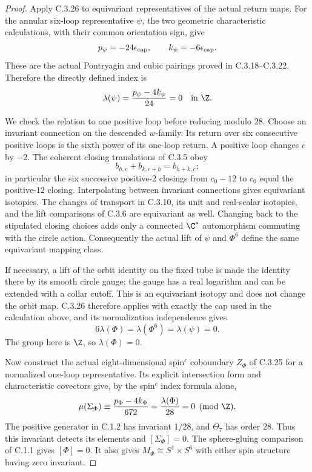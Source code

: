 \begin{proof}
Apply C.3.26 to equivariant representatives of the actual return
maps. For the annular six-loop representative $\psi$, the two
geometric characteristic calculations, with their common
orientation sign, give
\[
 p_\psi=-24\epsilon_{\rm cap},\qquad
 k_\psi=-6\epsilon_{\rm cap}.
\]
These are the actual Pontryagin and cubic pairings proved in
C.3.18--C.3.22. Therefore the directly defined index is
\[
 \lambda(\psi)=\frac{p_\psi-4k_\psi}{24}=0
 \quad\hbox{in }\Z.
\]

We check the relation to one positive loop before reducing
modulo $28$. Choose an invariant connection on the descended
$w$-family. Its return over six consecutive positive loops is
the sixth power of its one-loop return. A positive loop changes
$c$ by $-2$. The coherent closing translations of C.3.5 obey
\[
 b_{h,c}+b_{k,c+h}=b_{h+k,c};
\]
in particular the six successive positive-$2$ closings from
$c_0-12$ to $c_0$ equal the positive-$12$ closing. Interpolating
between invariant connections gives equivariant isotopies.
The changes of transport in C.3.10, its unit and real-scalar
isotopies, and the lift comparisons of C.3.6 are equivariant
as well. Changing back to the stipulated closing choices
adds only a connected $\C^*$ automorphism commuting with the
circle action. Consequently the actual lift of $\psi$ and
$\Phi^6$ define the same equivariant mapping class.

If necessary, a lift of the orbit identity on the fixed tube
is made the identity there by its smooth circle gauge; the
gauge has a real logarithm and can be extended with a collar
cutoff. This is an equivariant isotopy and does not change the
orbit map. C.3.26 therefore applies with exactly the cap used
in the calculation above, and its normalization independence
gives
\[
 6\lambda(\Phi)=\lambda(\Phi^6)=\lambda(\psi)=0.
\]
The group here is $\Z$, so $\lambda(\Phi)=0$.

Now construct the actual eight-dimensional spin$^c$ coboundary
$Z_\Phi$ of C.3.25 for a normalized one-loop representative.
Its explicit intersection form and characteristic covectors
give, by the spin$^c$ index formula alone,
\[
 \mu(\Sigma_\Phi)
   \equiv\frac{p_\Phi-4k_\Phi}{672}
   =\frac{\lambda(\Phi)}{28}=0\pmod\Z.
\]
The positive generator in C.1.2 has invariant $1/28$, and
$\Theta_7$ has order $28$. Thus this invariant detects its
elements and $[\Sigma_\Phi]=0$. The sphere-gluing comparison
of C.1.1 gives $[\Phi]=0$. It also gives
$M_\Phi\cong S^1\times S^6$ with either spin structure having
zero invariant.
\end{proof}

